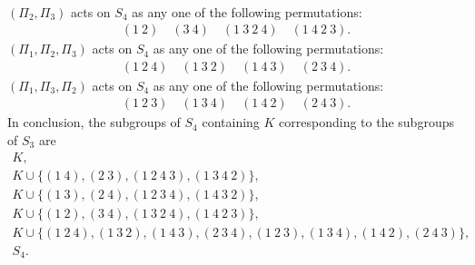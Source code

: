 \documentclass[a4paper,12pt]{article}
\begin{document}
\begin{enumerate}
\begin{gather*}
        \end{gather*}
        $(\Pi_2, \Pi_3)$ acts on $S_4$ as any one of the following permutations:
        \begin{gather*}
            (1\ 2) \quad (3\ 4) \quad (1\ 3\ 2\ 4) \quad (1\ 4\ 2\ 3).
        \end{gather*}
        $(\Pi_1, \Pi_2, \Pi_3)$ acts on $S_4$ as any one of the following permutations:
        \begin{gather*}
            (1\ 2\ 4) \quad (1\ 3\ 2) \quad (1\ 4\ 3) \quad (2\ 3\ 4).
        \end{gather*}
        $(\Pi_1, \Pi_3, \Pi_2)$ acts on $S_4$ as any one of the following permutations:
        \begin{gather*}
            (1\ 2\ 3) \quad (1\ 3\ 4) \quad (1\ 4\ 2) \quad (2\ 4\ 3).
        \end{gather*}
        In conclusion, the subgroups of $S_4$ containing $K$ corresponding to the subgroups of $S_3$ are
        \begin{gather*}
            K, \\
            K \cup \{ (1\ 4), (2\ 3), (1\ 2\ 4\ 3), (1\ 3\ 4\ 2) \}, \\
            K \cup \{ (1\ 3), (2\ 4), (1\ 2\ 3\ 4), (1\ 4\ 3\ 2) \}, \\
            K \cup \{ (1\ 2), (3\ 4), (1\ 3\ 2\ 4), (1\ 4\ 2\ 3) \}, \\
            K \cup \{ (1\ 2\ 4), (1\ 3\ 2), (1\ 4\ 3), (2\ 3\ 4), (1\ 2\ 3), (1\ 3\ 4), (1\ 4\ 2), (2\ 4\ 3) \}, \\
            S_4.
        \end{gather*}
\end{enumerate}
\end{document}
